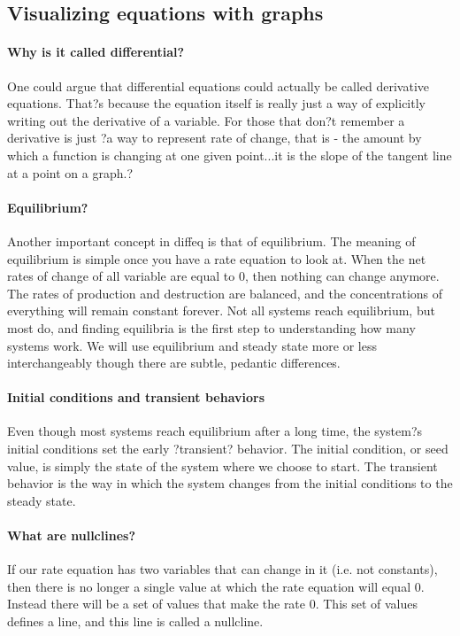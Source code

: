 



\subsection{Visualizing equations with graphs}
\paragraph{Why is it called differential?} One could argue that differential equations could actually be called derivative equations.  That?s because the equation itself is really just a way of explicitly writing out the derivative of a variable.  For those that don?t remember a derivative is just ?a way to represent rate of change, that is - the amount by which a function is changing at one given point...it is the slope of the tangent line at a point on a graph.?

\paragraph{Equilibrium?} Another important concept in diffeq is that of equilibrium.  The meaning of equilibrium is simple once you have a rate equation to look at.  When the net rates of change of all variable are equal to 0, then nothing can change anymore.  The rates of production and destruction are balanced, and the concentrations of everything will remain constant forever.  Not all systems reach equilibrium, but most do, and finding equilibria is the first step to understanding how many systems work.  We will use equilibrium and steady state more or less interchangeably though there are subtle, pedantic differences.

\paragraph{Initial conditions and transient behaviors} Even though most systems reach equilibrium after a long time, the system?s initial conditions set the early ?transient? behavior. The initial condition, or seed value, is simply the state of the system where we choose to start.  The transient behavior is the way in which the system changes from the initial conditions to the steady state.

\paragraph{What are nullclines?} If our rate equation has two variables that can change in it (i.e. not constants), then there is no longer a single value at which the rate equation will equal 0.  Instead there will be a set of values that make the rate 0.  This set of values defines a line, and this line is called a nullcline. 




